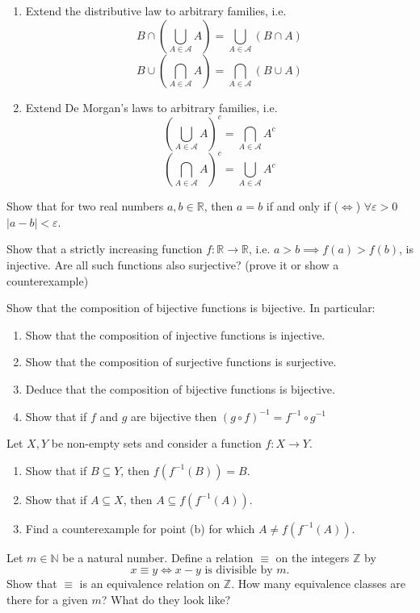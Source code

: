 \documentclass[11pt]{article}%
\begin{document}
\begin{Exercise}[title=**]
	\begin{enumerate}[label={\alph*)}]
		\item Extend the distributive law to arbitrary families, i.e.
		\[B\cap(\bigcup_{A\in\mathcal{A}}A) = \bigcup_{A\in\mathcal{A}}(B\cap A)\]
		\[B\cup(\bigcap_{A\in\mathcal{A}}A) = \bigcap_{A\in\mathcal{A}}(B\cup A)\]
		\item Extend De Morgan's laws to arbitrary families, i.e.
		\[(\bigcup_{A\in\mathcal{A}}A)^c = \bigcap_{A\in\mathcal{A}} A^c\]
		\[(\bigcap_{A\in\mathcal{A}}A)^c = \bigcup_{A\in\mathcal{A}} A^c\]
	\end{enumerate}
\end{Exercise}

\begin{Exercise}[title=*$\dagger$]
	Show that for two real numbers $a,b\in\mathbb R$, then $a=b$ if and only if ($\iff$) $\forall \varepsilon>0$ $|a-b|<\varepsilon$.
\end{Exercise}

\begin{Exercise}[title=**]
	Show that a strictly increasing function $f:\mathbb R \to \mathbb R$, i.e. $a>b \implies f(a)>f(b)$, is injective. Are all such functions also surjective? (prove it or show a counterexample)
\end{Exercise}

\begin{Exercise}[title=**$\dagger$]
	Show that the composition of bijective functions is bijective. In particular:
	\begin{enumerate}[label={\alph*)}]
		\item Show that the composition of injective functions is injective.
		\item Show that the composition of surjective functions is surjective.
		\item Deduce that the composition of bijective functions is bijective.
		\item Show that if $f$ and $g$ are bijective then $(g\circ f)^{-1}=f^{-1}\circ g^{-1}$
	\end{enumerate}
\end{Exercise}

\begin{Exercise}[title=**]
	Let $X,Y$ be non-empty sets and consider a function $f:X\to Y$.
	\begin{enumerate}[label={\alph*)}]
		\item Show that if $B\subseteq Y$, then $f(f^{-1}(B))=B$.
		\item Show that if $A\subseteq X$, then $A\subseteq f(f^{-1}(A))$.
		\item Find a counterexample for point (b) for which $A\neq f(f^{-1}(A))$.
	\end{enumerate}
\end{Exercise}

\begin{Exercise}[title=*]
	Let $m\in \mathbb N$ be a natural number. Define a relation $\equiv$ on the integers $\mathbb Z$ by
	\[x\equiv y\iff x-y\text{ is divisible by }m.\]
	Show that $\equiv$ is an equivalence relation on $\mathbb Z$. How many equivalence classes are there for a given $m$? What do they look like?
\end{Exercise}
\end{document}
